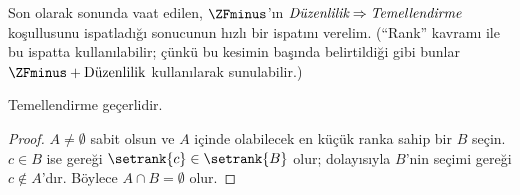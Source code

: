 \documentclass[../../../include/open-logic-section]{subfiles}
\begin{document}
Son olarak  sonunda vaat edilen, $\ZFminus$'ın
$\emph{Düzenlilik}\Rightarrow\emph{Temellendirme}$ koşullusunu
ispatladığı sonucunun hızlı bir ispatını verelim. (``Rank'' kavramı ile
 bu ispatta kullanılabilir; çünkü bu kesimin
başında belirtildiği gibi bunlar $\ZFminus+\text{Düzenlilik}$ kullanılarak
sunulabilir.)

\begin{prop}
Temellendirme geçerlidir.
\end{prop}

\begin{proof}
$A\neq\emptyset$ sabit olsun ve $A$ içinde olabilecek en küçük ranka sahip
bir $B$ seçin. $c\in B$ ise  gereği
$\setrank{c}\in\setrank{B}$ olur; dolayısıyla $B$'nin seçimi gereği
$c\notin A$'dır. Böylece $A\cap B=\emptyset$ olur.
\end{proof}
\end{document}
